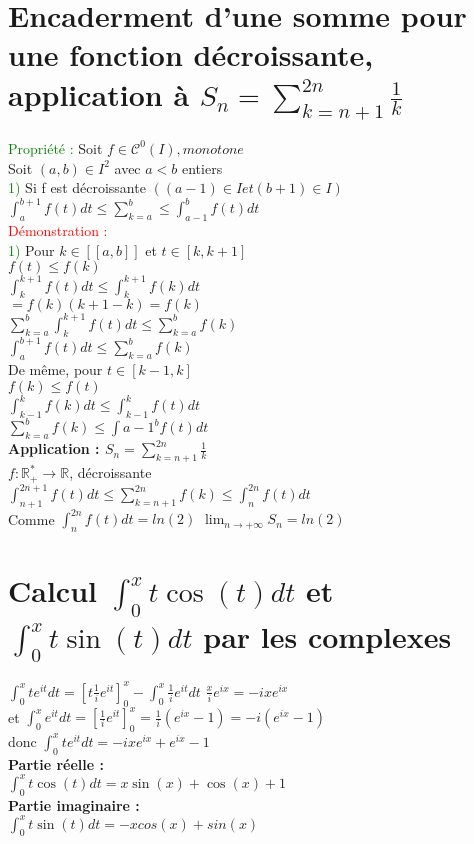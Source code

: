 \documentclass{article}
\begin{document}
    \section{Encaderment d'une somme pour une fonction décroissante, application à $S_n=\sum_{k=n+1}^{2n} \frac{1}{k}$}
    \textcolor{green}{Propriété :} Soit $f \in \mathcal{C}^0(I), monotone$ \\ 
    Soit $(a,b) \in I^2$ avec $a< b$ entiers \\ 
    \textcolor{green}{1)} Si f est décroissante $((a-1) \in I et (b+1) \in I)$ \\ 
    $\int_a^{b+1}f(t)dt \leq \sum_{k=a}^b\leq \int_{a-1}^{b}f(t)dt$ \\ 
    \textcolor{red}{Démonstration :} \\ 
    \textcolor{green}{1)} Pour $k \in [[a,b]]$ et $t \in [k,k+1]$ \\ 
    $f(t)\leq f(k)$ \\ 
    $\int_k^{k+1}f(t)dt \leq \int_k^{k+1}f(k)dt$ \\ 
    $=f(k)(k+1-k)=f(k)$ \\ 
    $\sum_{k=a}^{b}\int_k^{k+1}f(t)dt \leq \sum_{k=a}^bf(k)$ \\ 
    $\int_a^{b+1}f(t)dt\leq \sum_{k=a}^bf(k)$ \\ 
    De même, pour $t \in [k-1,k]$ \\ 
    $f(k) \leq f(t)$ \\ 
    $\int_{k-1}^kf(k)dt \leq \int_{k-1}^kf(t)dt$ \\
    $\sum_{k=a}^bf(k)\leq \int{a-1}^bf(t)dt$ \\ 
    {\bf Application : $S_n=\sum_{k=n+1}^{2n} \frac{1}{k}$} \\ 
    $f:\mathbb{R}^*_+ \rightarrow \mathbb{R}$, décroissante \\ 
    $\int_{n+1}^{2n+1}f(t)dt \leq \sum_{k=n+1}^{2n}f(k) \leq \int_n^{2n}f(t)dt$ \\ 
    Comme $\int_n^{2n}f(t)dt=ln(2)$ $\lim_{n \rightarrow + \infty} S_n= ln(2)$
    \section{Calcul $\int_{0}^{x}t\cos(t)dt$ et $\int_{0}^{x}t\sin(t)dt$ par les complexes}
    $\int_0^xt e^{it}dt=[t \frac{1}{i}e^{it}]_0^x-\int_0^x\frac{1}{i}e^{it}dt$
    $\frac{x}{i}e^{ix}=-ixe^{ix}$ \\ 
    et $\int_0^xe^{it}dt=[\frac{1}{i}e^{it}]^x_0=\frac{1}{i}(e^{ix}-1)=-i(e^{ix}-1)$ \\ 
    donc $\int_0^xte^{it}dt=-ixe^{ix}+e^{ix}-1$ \\ 
    {\bf Partie réelle :} \\ 
    $\int_0^xt\cos(t)dt=x\sin(x)+\cos(x)+1$ \\ 
    {\bf Partie imaginaire :} \\ 
    $\int_0^xt\sin(t)dt=-xcos(x)+sin(x)$
    
\end{document}
